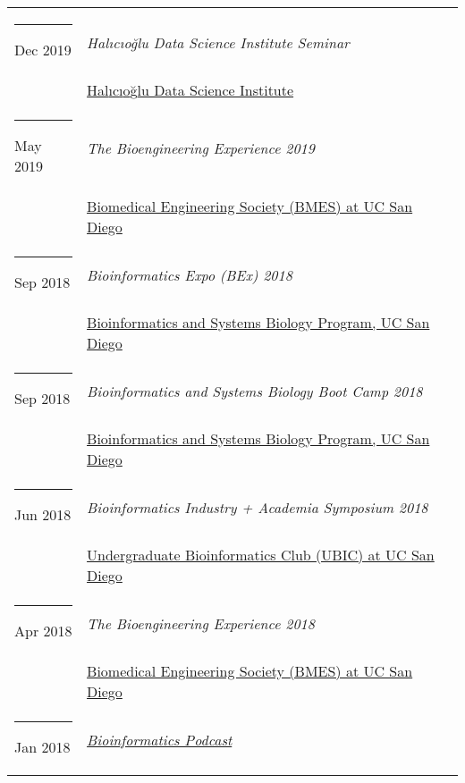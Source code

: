 \documentclass[margin,line]{res}
\begin{document}
\begin{resume}
\begin{longtable}{@{}p{0.7in}p{4in}}
\hspace*{-4mm} \rule{-1mm}{5mm} Dec 2019 & \textit{Hal{\i}c{\i}o{\u g}lu Data Science Institute Seminar}\\*
\hspace*{-4mm} & \hspace{4mm} \href{https://datascience.ucsd.edu/}{Hal{\i}c{\i}o{\u g}lu Data Science Institute}\\
\hspace*{-4mm} \rule{-1mm}{5mm} May 2019 & \textit{The Bioengineering Experience 2019}\\*
\hspace*{-4mm} & \hspace{4mm} \href{http://bmes.ucsd.edu/}{Biomedical Engineering Society (BMES) at UC San Diego}\\
\hspace*{-4mm} \rule{-1mm}{5mm} Sep 2018 & \textit{Bioinformatics Expo (BEx) 2018}\\*
\hspace*{-4mm} & \hspace{4mm} \href{http://bioinformatics.ucsd.edu/}{Bioinformatics and Systems Biology Program, UC San Diego}\\
\hspace*{-4mm} \rule{-1mm}{5mm} Sep 2018 & \textit{Bioinformatics and Systems Biology Boot Camp 2018}\\*
\hspace*{-4mm} & \hspace{4mm} \href{http://bioinformatics.ucsd.edu/}{Bioinformatics and Systems Biology Program, UC San Diego}\\
\hspace*{-4mm} \rule{-1mm}{5mm} Jun 2018 & \textit{Bioinformatics Industry + Academia Symposium 2018}\\*
\hspace*{-4mm} & \hspace{4mm} \href{http://ubicucsd.github.io/}{Undergraduate Bioinformatics Club (UBIC) at UC San Diego}\\
\hspace*{-4mm} \rule{-1mm}{5mm} Apr 2018 & \textit{The Bioengineering Experience 2018}\\*
\hspace*{-4mm} & \hspace{4mm} \href{http://bmes.ucsd.edu/}{Biomedical Engineering Society (BMES) at UC San Diego}\\
\hspace*{-4mm} \rule{-1mm}{5mm} Jan 2018 & \href{https://soundcloud.com/ubicucsd/ubic-podcast-episode-1}{\textit{Bioinformatics Podcast}}\\*

\end{longtable}
\end{resume}
\end{document}
